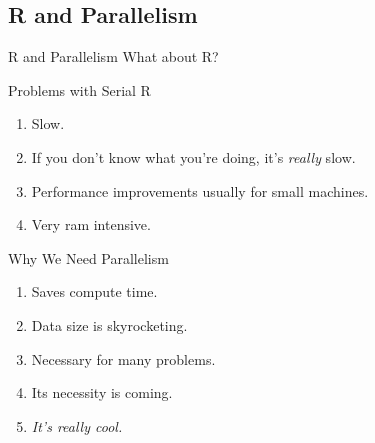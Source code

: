 
\subsection{R and Parallelism}


\begin{frame}
  \begin{block}{R and Parallelism}\pause
  What about R?
  \end{block}
\end{frame}

\begin{frame}
  \begin{block}{Problems with Serial R}\pause
  \begin{enumerate}[<+-|alert@+>]
    \item Slow.
    \item If you don't know what you're doing, it's \emph{really} slow.
    \item Performance improvements usually for small machines.
    \item Very ram intensive.
  \end{enumerate}
  \end{block}
\end{frame}


\begin{frame}
  \begin{block}{Why We Need Parallelism}\pause
    \begin{enumerate}[<+-|alert@+>]
      \item Saves compute time.
      \item Data size is skyrocketing.
      \item Necessary for many problems.
      \item Its necessity is coming.
      \item \emph{It's really cool.}
  \end{enumerate}
  \end{block}
\end{frame}

